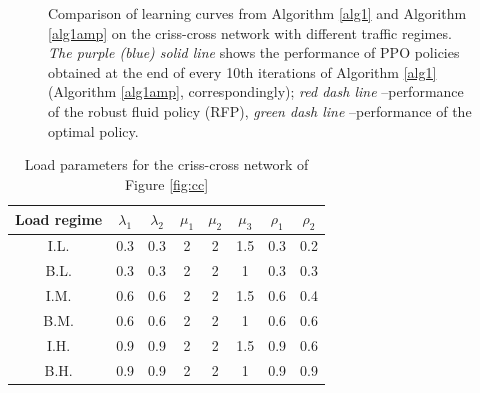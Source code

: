 \documentclass[11pt]{article}
\theoremstyle{definition}
\numberwithin{equation}{section}
\begin{document}
\begin{figure}[H]
{     }





     \caption{Comparison of learning curves from Algorithm \ref{alg1} and Algorithm \ref{alg1amp}  on the criss-cross network with different traffic regimes.
     \textit{The purple (blue) solid line} shows the performance of  PPO policies obtained at the end of every 10th iterations of Algorithm \ref{alg1} (Algorithm \ref{alg1amp}, correspondingly);
       \textit{red dash line} --performance of the robust fluid policy (RFP), \textit{green dash line} --performance of the optimal policy. }
     \label{fig:cc_opt}
   \end{figure}
\begin{table}[H]
\centering
\begin{tabular}{|c|c|c|c|c|c|c|c|}
  \hline
  Load regime  & $\lambda_1$ & $\lambda_2 $ & $\mu_1$ & $\mu_2$ & $\mu_3$ & $\rho_1$ & $\rho_2$\\\hline
  I.L. & 0.3 & 0.3& 2 & 2 &1.5& 0.3&0.2\\\hline
  B.L. & 0.3 & 0.3 & 2 & 2 &1 &0.3&0.3\\\hline
  I.M. & 0.6 & 0.6  & 2 & 2 &1.5& 0.6&0.4\\\hline
  B.M. & 0.6 & 0.6  & 2 & 2 &1& 0.6&0.6\\\hline
  I.H. & 0.9 & 0.9 & 2 & 2 &1.5& 0.9&0.6\\\hline
  B.H. & 0.9 & 0.9 & 2 & 2&1&0.9&0.9 \\

  \hline


\end{tabular}
 \caption[]{Load parameters for the criss-cross network of Figure \ref{fig:cc}
 }\label{t:lp}
\end{table}
\end{document}
